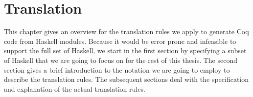 \chapter{Translation} \label{chp:translation}

This chapter gives an overview for the translation rules we apply to generate Coq code from Haskell modules.
Because it would be error prone and infeasible to support the full set of Haskell, we start in the first section by specifying a subset of Haskell that we are going to focus on for the rest of this thesis.
The second section gives a brief introduction to the notation we are going to employ to describe the translation rules.
The subsequent sections deal with the specification and explanation of the actual translation rules.







